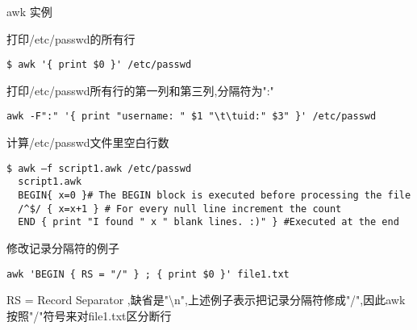 \begin{frame}{awk 实例}
\begin{block}{打印/etc/passwd的所有行}
\begin{verbatim}
$ awk '{ print $0 }' /etc/passwd
\end{verbatim}
\end{block}

\begin{block}{打印/etc/passwd所有行的第一列和第三列,分隔符为":"}
\begin{verbatim}
awk -F":" '{ print "username: " $1 "\t\tuid:" $3" }' /etc/passwd 
\end{verbatim}
\end{block}

\begin{block}{计算/etc/passwd文件里空白行数}
\begin{verbatim}
$ awk –f script1.awk /etc/passwd
  script1.awk
  BEGIN{ x=0 }# The BEGIN block is executed before processing the file
  /^$/ { x=x+1 } # For every null line increment the count
  END { print "I found " x " blank lines. :)" } #Executed at the end
\end{verbatim}
\end{block}

\begin{block}{修改记录分隔符的例子}
\begin{verbatim}
awk 'BEGIN { RS = "/" } ; { print $0 }' file1.txt
\end{verbatim}
RS = Record Separator ,缺省是"\textbackslash{}n",上述例子表示把记录分隔符修成"/",因此awk按照"/"符号来对file1.txt区分断行
\end{block}
\end{frame}

